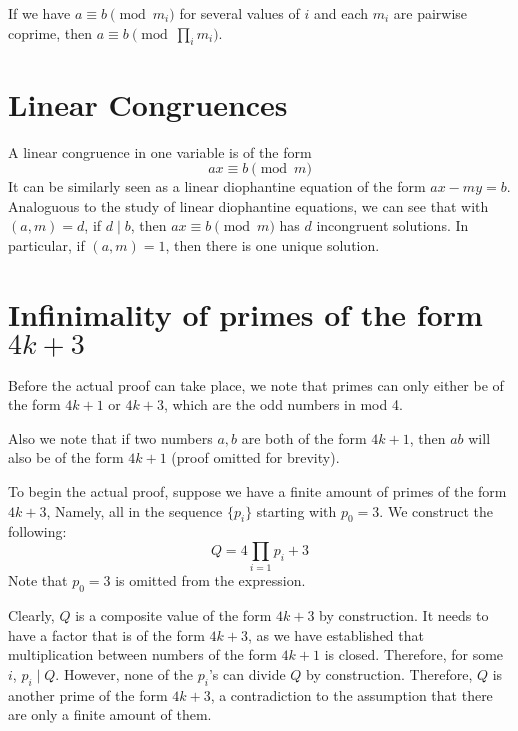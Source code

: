 \documentclass{article}
\begin{document}
\begin{multicols*}{2}
If we have $a \equiv b \pmod{m_i}$ for several values of $i$ and each $m_i$ are pairwise coprime, then $a \equiv b \pmod{\prod_im_i}$.

\section{Linear Congruences}

A linear congruence in one variable is of the form \[ax \equiv b \pmod{m}\] It can be similarly seen as a linear diophantine equation of the form $ax - my = b$. Analoguous to the study of linear diophantine equations, we can see that with $(a, m) = d$, if $d \mid b$, then $ax \equiv b \pmod{m}$ has $d$ incongruent solutions. In particular, if $(a,m) = 1$, then there is one unique solution.

\newpage

\section{Infinimality of primes of the form $4k+3$}

Before the actual proof can take place, we note that primes can only either be of the form $4k+1$ or $4k+3$, which are the odd numbers in mod 4.

Also we note that if two numbers $a, b$ are both of the form $4k +1$, then $ab$ will also be of the form $4k + 1$ (proof omitted for brevity).

To begin the actual proof, suppose we have a finite amount of primes of the form $4k+3$, Namely, all in the sequence $\{p_i\}$ starting with $p_0 = 3$. We construct the following: \[Q = 4\prod_{i=1}{p_i} + 3\]Note that $p_0 = 3$ is omitted from the expression.

Clearly, $Q$ is a composite value of the form $4k+3$ by construction. It needs to have a factor that is of the form $4k+3$, as we have established that multiplication between numbers of the form $4k+1$ is closed. Therefore, for some $i$, $p_i \mid Q$. However, none of the $p_i$'s can divide $Q$ by construction. Therefore, $Q$ is another prime of the form $4k+3$, a contradiction to the assumption that there are only a finite amount of them.

\end{multicols*}
\end{document}
